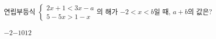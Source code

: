 연립부등식 $\begin{cases} 2x+1<3x-a \\ 5-5x>1-x \end{cases}$의 해가 $-2<x<b$일 때, $a+b$의 값은? 
\begin{choices32}{$-2$}{$-1$}{$0$}{$1$}{$2$}\end{choices32}
